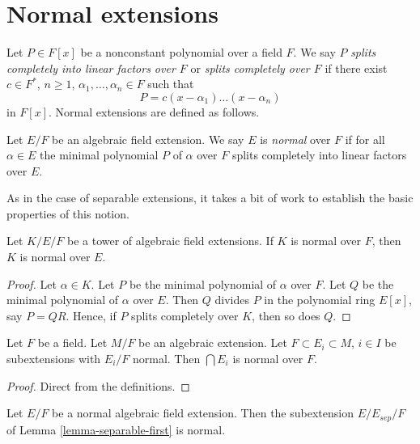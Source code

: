 \section{Normal extensions}
\label{section-normal}

\noindent
Let $P \in F[x]$ be a nonconstant polynomial over a field $F$. We say $P$
{\it splits completely into linear factors over $F$} or
{\it splits completely over $F$} if there exist
$c \in F^*$, $n \geq 1$, $\alpha_1, \ldots, \alpha_n \in F$ such that
$$
P = c(x - \alpha_1) \ldots (x - \alpha_n)
$$
in $F[x]$. Normal extensions are defined as follows.

\begin{definition}
\label{definition-normal}
Let $E/F$ be an algebraic field extension. We say $E$ is {\it normal}
over $F$ if for all $\alpha \in E$ the minimal polynomial $P$
of $\alpha$ over $F$ splits completely into linear factors over $E$.
\end{definition}

\noindent
As in the case of separable extensions, it takes a bit of work to establish
the basic properties of this notion.

\begin{lemma}
\label{lemma-normal-goes-up}
Let $K/E/F$ be a tower of algebraic field extensions.
If $K$ is normal over $F$, then $K$ is normal over $E$.
\end{lemma}

\begin{proof}
Let $\alpha \in K$. Let $P$ be the minimal polynomial of $\alpha$ over $F$.
Let $Q$ be the minimal polynomial of $\alpha$ over $E$.
Then $Q$ divides $P$ in the polynomial ring $E[x]$, say $P = QR$.
Hence, if $P$ splits completely over $K$, then so does $Q$.
\end{proof}

\begin{lemma}
\label{lemma-intersect-normal}
Let $F$ be a field. Let $M/F$ be an algebraic extension. Let
$F \subset E_i \subset M$, $i \in I$ be subextensions with
$E_i/F$ normal. Then $\bigcap E_i$ is normal over $F$.
\end{lemma}

\begin{proof}
Direct from the definitions.
\end{proof}

\begin{lemma}
\label{lemma-separable-first-normal}
Let $E/F$ be a normal algebraic field extension. Then the subextension
$E/E_{sep}/F$ of Lemma \ref{lemma-separable-first} is normal.
\end{lemma}

